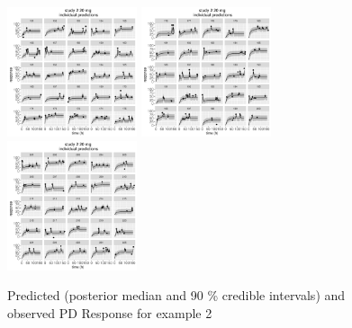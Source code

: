 \documentclass[11pt]{amsart}
\begin{document}
\begin{figure}[htbp]
\includegraphics[width=1.5in,trim=0in 0in 0 0in]{graphics/effCptModelTorsten/effCptModelTorstenPlots024.pdf}
\includegraphics[width=1.5in,trim=0in 0in 0 0in]{graphics/effCptModelTorsten/effCptModelTorstenPlots025.pdf}
\includegraphics[width=1.5in,trim=0in 0in 0 0in]{graphics/effCptModelTorsten/effCptModelTorstenPlots026.pdf}
\caption{{Predicted (posterior median and 90 \% credible intervals) and observed PD Response for example 2}}
\label{effCptModelPredictionsPD}
\end{figure}
\end{document}
